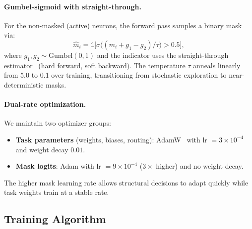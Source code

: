 \paragraph{Gumbel-sigmoid with straight-through.}
\label{sec:gumbel}
For the non-masked (active) neurons, the forward pass samples a binary mask via:
\begin{equation}
\hat{m}_i = \mathbb{1}\bigl[\sigma\bigl((m_i + g_1 - g_2) / \tau\bigr) > 0.5\bigr],
\end{equation}
where $g_1, g_2 \sim \text{Gumbel}(0,1)$ and the indicator uses the straight-through estimator~\citep{bengio2013estimating} (hard forward, soft backward). The temperature $\tau$ anneals linearly from 5.0 to 0.1 over training, transitioning from stochastic exploration to near-deterministic masks.

\paragraph{Dual-rate optimization.} We maintain two optimizer groups:
\begin{itemize}
    \item \textbf{Task parameters} (weights, biases, routing): AdamW~\citep{loshchilov2019decoupled} with lr $= 3{\times}10^{-4}$ and weight decay $0.01$.
    \item \textbf{Mask logits}: Adam with lr $= 9{\times}10^{-4}$ ($3{\times}$ higher) and no weight decay.
\end{itemize}
The higher mask learning rate allows structural decisions to adapt quickly while task weights train at a stable rate.

\subsection{Training Algorithm}
\label{sec:algorithm}

